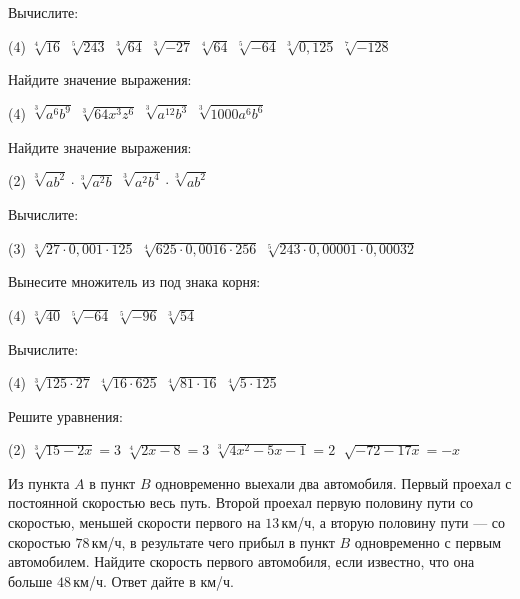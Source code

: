 %
%

\begin{class}[number=1]
	\begin{listofex}
		\item Вычислите:
		\begin{tasks}(4)
			\task \( \sqrt[4]{16} \)
			\task \( \sqrt[5]{243} \)
			\task \( \sqrt[3]{64} \)
			\task \( \sqrt[3]{-27} \)
			\task \( \sqrt[4]{64} \)
			\task \( \sqrt[5]{-64} \)
			\task \( \sqrt[3]{0,125} \)
			\task \( \sqrt[7]{-128} \)
		\end{tasks}
		\item Найдите значение выражения:
		\begin{tasks}(4)
			\task \( \sqrt[3]{a^6b^9} \)
			\task \( \sqrt[3]{64x^3z^6} \)
			\task \( \sqrt[3]{a^{12}b^3} \)
			\task \( \sqrt[3]{1000a^6b^6} \)
		\end{tasks}
		\item Найдите значение выражения:
		\begin{tasks}(2)
			\task \( \sqrt[3]{ab^2} \cdot \sqrt[3]{a^2b} \)
			\task \( \sqrt[3]{a^2b^4} \cdot \sqrt[3]{ab^2} \)
		\end{tasks}
		\item Вычислите:
		\begin{tasks}(3)
			\task \( \sqrt[3]{27 \cdot 0,001 \cdot 125} \)
			\task \( \sqrt[4]{625 \cdot 0,0016 \cdot 256} \)
			\task \( \sqrt[5]{243 \cdot 0,00001 \cdot 0,00032} \)
		\end{tasks}
		\item Вынесите множитель из под знака корня:
		\begin{tasks}(4)
			\task \( \sqrt[3]{40} \)
			\task \( \sqrt[5]{-64} \)
			\task \( \sqrt[5]{-96} \)
			\task \( \sqrt[3]{54} \)
		\end{tasks}
		\item Вычислите:
		\begin{tasks}(4)
			\task \( \sqrt[3]{125 \cdot 27} \)
			\task \( \sqrt[4]{16 \cdot 625} \)
			\task \( \sqrt[4]{81 \cdot 16} \)
			\task \( \sqrt[4]{5 \cdot 125} \)
		\end{tasks}
		\item Решите уравнения:
		\begin{tasks}(2)
			\task \( \sqrt[3]{15-2x} = 3 \)
			\task \( \sqrt[4]{2x-8}=3 \)
			\task \( \sqrt[3]{4x^2-5x-1}=2 \)
			\task \( \sqrt[]{-72-17x}=-x \)
		\end{tasks}
		\item Из пункта \(A\) в пункт \(B\) одновременно выехали два автомобиля. Первый проехал с постоянной скоростью весь путь. Второй проехал первую половину пути со скоростью, меньшей скорости первого на \(13\) км/ч, а вторую половину пути  --- со скоростью \(78\) км/ч, в результате чего прибыл в пункт \(B\) одновременно с первым автомобилем. Найдите скорость первого автомобиля, если известно, что она больше \(48\) км/ч. Ответ дайте в км/ч.
	\end{listofex}
\end{class}

